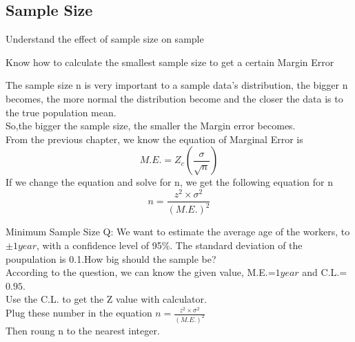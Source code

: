 \subsection{Sample Size}
\begin{objectives}
    \item Understand the effect of sample size on sample
    \item Know how to calculate the smallest sample size to get a certain Margin Error
\end{objectives}
\vbox{}
The sample size n is very important to a sample data's distribution, the bigger n becomes, the more normal the distribution become and the closer the data is to the true population mean.\\
\vbox{}
So,the bigger the sample size, the smaller the Margin error becomes.\\
\vbox{}
From the previous chapter, we know the equation of Marginal Error is
\begin{equation}
   M.E.= Z_{c} (\frac{\sigma}{\sqrt{n}} )
\end{equation}
If we change the equation and solve for n, we get the following equation for n
\begin{equation}
    n=\frac{z^{2}\times \sigma^{2}}{(M.E.)^{2}}
\end{equation}
\begin{examplebox}{Minimum Sample Size}
    Q: We want to estimate the average age of the workers, to \(\pm 1 year\), with a confidence level of 95\%. The standard deviation of the poupulation is 0.1.How big should the sample be? \\
According to the question, we can know the given value, M.E.=\(1 year\) and C.L.=\(0.95\). \\
Use the C.L. to get the Z value with calculator.\\
Plug these number in the equation \(n=\frac{z^{2}\times \sigma^{2}}{(M.E.)^{2}}\)\\
Then roung n to the nearest integer.
 
\end{examplebox}